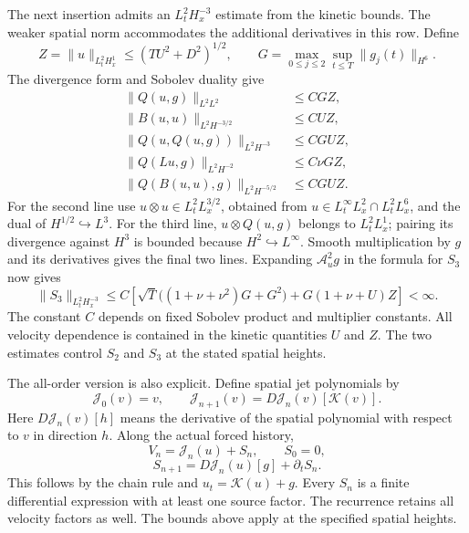 The next insertion admits an \(L^2_tH^{-3}_x\) estimate from
the kinetic bounds. The weaker spatial norm accommodates the
additional derivatives in this row. Define
\[
Z=\|u\|_{L^2_tH^1_x}\le(TU^2+D^2)^{1/2},\qquad
G=\max_{0\le j\le2}\sup_{t\le T}\|g_j(t)\|_{H^6}.
\]
The divergence form and Sobolev duality give
\[
\begin{aligned}
\|Q(u,g)\|_{L^2L^2}&\le C GZ,\\
\|B(u,u)\|_{L^2H^{-3/2}}&\le C UZ,\\
\|Q(u,Q(u,g))\|_{L^2H^{-3}}&\le C G UZ,\\
\|Q(Lu,g)\|_{L^2H^{-2}}&\le C\nu GZ,\\
\|Q(B(u,u),g)\|_{L^2H^{-5/2}}&\le C G UZ.
\end{aligned}
\]
For the second line use \(u\otimes u\in L^2_tL^{3/2}_x\), obtained from \(u\in L^\infty_tL^2_x\cap L^2_tL^6_x\), and the dual of \(H^{1/2}\hookrightarrow L^3\). For the third line, \(u\otimes Q(u,g)\) belongs to \(L^2_tL^1_x\); pairing its divergence against \(H^3\) is bounded because \(H^2\hookrightarrow L^\infty\). Smooth multiplication by \(g\) and its derivatives gives the final two lines. Expanding \(\mathcal A_u^2g\) in the formula for \(S_3\) now gives
\[
\|S_3\|_{L^2_tH^{-3}_x}
\le C\left[
\sqrt{T}\bigl((1+\nu+\nu^2)G+G^2\bigr)
+G(1+\nu+U)Z\right]<\infty.
\]
The constant \(C\) depends on fixed Sobolev product and multiplier constants. All velocity dependence is contained in the kinetic quantities \(U\) and \(Z\). The two estimates control \(S_2\) and \(S_3\) at the stated spatial heights.

The all-order version is also explicit. Define spatial jet polynomials by
\[
\mathcal J_0(v)=v,\qquad
\mathcal J_{n+1}(v)=D\mathcal J_n(v)[\mathcal K(v)].
\]
Here \(D\mathcal J_n(v)[h]\) means the derivative of the spatial polynomial with respect to \(v\) in direction \(h\). Along the actual forced history,
\[
V_n=\mathcal J_n(u)+S_n,\qquad S_0=0,
\]
\[
S_{n+1}=D\mathcal J_n(u)[g]+\partial_t S_n.
\]
This follows by the chain rule and \(u_t=\mathcal K(u)+g\). Every \(S_n\) is a finite differential expression with at least one source factor. The recurrence retains all velocity factors as well. The bounds above apply at the specified spatial heights.

